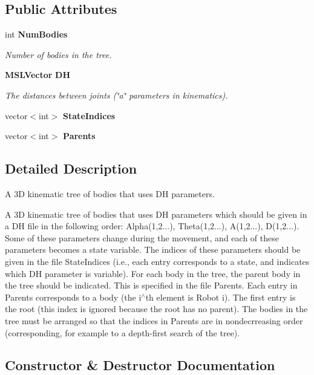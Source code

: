 \subsection*{Public Attributes}
\begin{CompactItemize}
\item 
int {\bf Num\-Bodies}
\begin{CompactList}\small\item\em Number of bodies in the tree.\item\end{CompactList}\item 
{\bf MSLVector} {\bf DH}
\begin{CompactList}\small\item\em The distances between joints (\char`\"{}a\char`\"{} parameters in kinematics).\item\end{CompactList}\item 
vector$<$int$>$ {\bf State\-Indices}
\item 
vector$<$int$>$ {\bf Parents}
\end{CompactItemize}


\subsection{Detailed Description}
A 3D kinematic tree of bodies that uses DH parameters.

A 3D kinematic tree of bodies that uses DH parameters which should be given in a DH file in the following order: Alpha(1,2...), Theta(1,2...), A(1,2...), D(1,2...). Some of these parameters change during the movement, and each of these parameters becomes a state variable. The indices of these parameters should be given in the file State\-Indices (i.e., each entry corresponds to a state, and indicates which DH parameter is variable). For each body in the tree, the parent body in the tree should be indicated. This is specified in the file Parents. Each entry in Parents corresponds to a body (the i$^\wedge$th element is Robot i). The first entry is the root (this index is ignored because the root has no parent). The bodies in the tree must be arranged so that the indices in Parents are in nondecrreasing order (corresponding, for example to a depth-first search of the tree). 



\subsection{Constructor \& Destructor Documentation}
